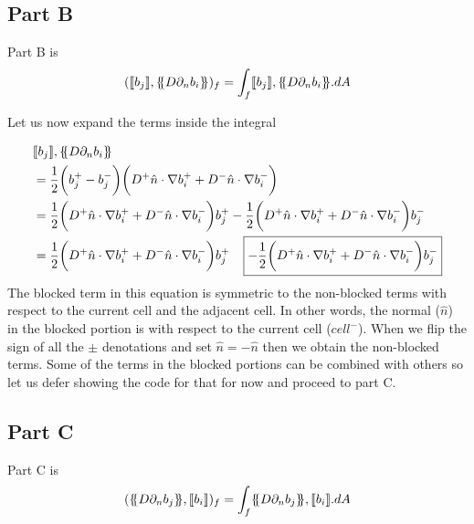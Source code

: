 \documentclass[11pt,letterpaper,titlepage]{article}
\newcommand*{\ldblbrace}{\{\mskip-5mu\{}
\newcommand*{\rdblbrace}{\}\mskip-5mu\}}
\numberwithin{equation}{section}
\begin{document}
\vspace{0.5cm}
\subsection{Part B}
Part B is 
\begin{equation*}
(\llbracket b_j \rrbracket,\ldblbrace D \partial_n b_i \rdblbrace)_f  =
\int_f \llbracket b_j \rrbracket,\ldblbrace D \partial_n b_i \rdblbrace .dA
\end{equation*}

Let us now expand the terms inside the integral

\begin{equation*}
\begin{aligned}
 &\llbracket b_j \rrbracket,\ldblbrace D \partial_n b_i \rdblbrace \\
 &= \frac{1}{2}\biggr(b_j^+ - b_j^-\biggr)\biggr(D^+\hat{n}\cdot\nabla b_i^+ + D^-\hat{n}\cdot\nabla b_i^-\biggr)\\
  &=\frac{1}{2}\biggr(D^+\hat{n}\cdot\nabla b_i^+ + D^-\hat{n}\cdot\nabla b_i^- \biggr)b_j^+
  - \frac{1}{2}\biggr(D^+\hat{n}\cdot\nabla b_i^+ + D^-\hat{n}\cdot\nabla b_i^- \biggr)b_j^-\\
 &=\frac{1}{2}\biggr(D^+\hat{n}\cdot\nabla b_i^+ + D^-\hat{n}\cdot\nabla b_i^-\biggr)b_j^+
 \Aboxed{
 - \frac{1}{2}\biggr(D^+\hat{n}\cdot\nabla b_i^+ + D^-\hat{n}\cdot\nabla b_i^-\biggr)b_j^-}
\end{aligned}
\end{equation*}
\newline
The blocked term in this equation is symmetric to the non-blocked terms with respect to the current cell and the adjacent cell. In other words, the normal ($\hat{n}$) in the blocked portion is with respect to the current cell ($cell^-$). When we flip the sign of all the $\pm$ denotations and set $\hat{n} = -\hat{n}$ then we obtain the non-blocked terms.
Some of the terms in the blocked portions can be combined with others so let us defer showing the code for that for now and proceed to part C.

\subsection{Part C}
Part C is
\begin{equation*}
(\ldblbrace D \partial_n b_j \rdblbrace,\llbracket b_i \rrbracket)_f  =
\int_f \ldblbrace D \partial_n b_j \rdblbrace,\llbracket b_i \rrbracket .dA
\end{equation*}
\end{document}
